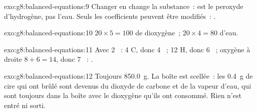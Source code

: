 \begin{solution}{exo:g8:balanced-equations:9}
Changer  en  change la substance~:  est le
peroxyde d'hydrogène, pas l'eau. Seuls les coefficients peuvent être
modifiés~: .
\end{solution}

\begin{solution}{exo:g8:balanced-equations:10}
$20 \times 5 = 100$  de dioxygène~; $20 \times 4 = 80$
 d'eau.
\end{solution}

\begin{solution}{exo:g8:balanced-equations:11}
Avec 2 ~: 4 C, donc 4 ~; 12 H, donc 6 ~;
oxygène à droite $8 + 6 = 14$, donc 7 ~:
.
\end{solution}

\begin{solution}{exo:g8:balanced-equations:12}
Toujours \qty{850.0}{g}. La boîte est scellée~: les \qty{0.4}{g} de
cire qui ont brûlé sont devenus du dioxyde de carbone et de la vapeur
d'eau, qui sont toujours dans la boîte avec le dioxygène qu'ils ont
consommé. Rien n'est entré ni sorti.
\end{solution}

